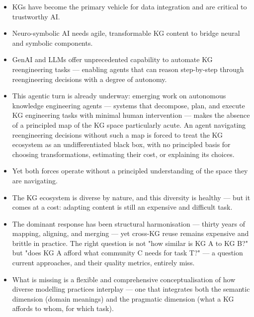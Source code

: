 \documentclass[runningheads]{llncs}
\begin{document}
\begin{itemize}
    \item KGs have become the primary vehicle for data integration and are critical to trustworthy AI.
    \item Neuro-symbolic AI needs agile, transformable KG content to bridge neural and symbolic components.
    \item GenAI and LLMs offer unprecedented capability to automate KG reengineering tasks --- enabling agents that can reason step-by-step through reengineering decisions with a degree of autonomy. %
    \item This agentic turn is already underway: emerging work on autonomous knowledge engineering agents --- systems that decompose, plan, and execute KG engineering tasks with minimal human intervention --- makes the absence of a principled map of the KG space particularly acute. An agent navigating reengineering decisions without such a map is forced to treat the KG ecosystem as an undifferentiated black box, with no principled basis for choosing transformations, estimating their cost, or explaining its choices. %
	\item Yet both forces operate without a principled understanding of the space they are navigating.
    \item The KG ecosystem is diverse by nature, and this diversity is healthy --- but it comes at a cost: adapting content is still an expensive and difficult task.
    \item The dominant response has been structural harmonisation — thirty years of mapping, aligning, and merging — yet cross-KG reuse remains expensive and brittle in practice. The right question is not "how similar is KG A to KG B?" but "does KG A afford what community C needs for task T?" — a question current approaches, and their quality metrics, entirely miss. %
    \item What is missing is a flexible and comprehensive conceptualisation of how diverse modelling practices interplay --- one that integrates both the semantic dimension (domain meanings) and the pragmatic dimension (what a KG affords to whom, for which task). %

\end{itemize}
\end{document}
